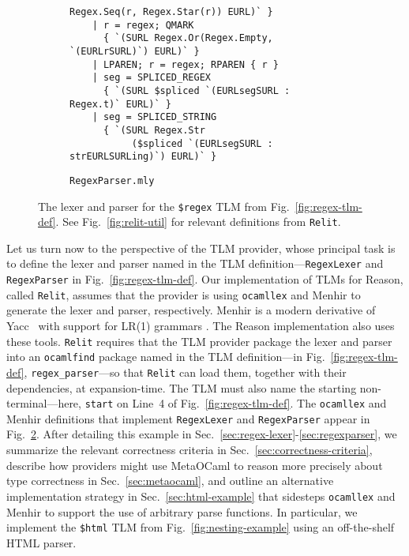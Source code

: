 \documentclass[acmsmall,screen]{acmart}
\newcommand{\li}[1]{\lstinline[basicstyle=\ttfamily\fontsize{9pt}{1em}\selectfont]{#1}}
\begin{document}
\begin{figure}
\begin{subfigure}[t]{0.61\textwidth}
\begin{lstlisting}[morekeywords={token,left,start},stringstyle=\ttfamily\color{black}]
           Regex.Seq(r, Regex.Star(r)) EURL)` }
    | r = regex; QMARK 
      { `(SURL Regex.Or(Regex.Empty, `(EURLrSURL)`) EURL)` }
    | LPAREN; r = regex; RPAREN { r }
    | seg = SPLICED_REGEX 
      { `(SURL $spliced `(EURLsegSURL : Regex.t)` EURL)` }
    | seg = SPLICED_STRING 
      { `(SURL Regex.Str
           ($spliced `(EURLsegSURL : strEURLSURLing)`) EURL)` }
\end{lstlisting}
\vspace{-5px}
\caption{\li{RegexParser.mly}}
\label{fig:regex-parser}
\end{subfigure}
\vspace{1px}
\caption{The lexer and parser for the \li{$regex} TLM from Fig.~\ref{fig:regex-tlm-def}. See Fig.~\ref{fig:relit-util} for relevant definitions from \li{Relit}.}
\label{fig:lexer-and-parser}
\vspace{-7px}
\end{figure}

Let us turn now to the perspective of the TLM provider, whose principal task is to define the lexer and parser named in the TLM definition---\li{RegexLexer} and \li{RegexParser} in Fig.~\ref{fig:regex-tlm-def}. Our implementation of TLMs for Reason, called \li{Relit}, assumes that the provider is using \li{ocamllex} \cite{ocaml-manual} and Menhir  \cite{pottier2016menhir,DBLP:journals/entcs/PottierR06} to generate the lexer and parser, respectively. Menhir is a modern derivative of Yacc~\cite{johnson1975yacc} with support for LR(1) grammars \cite{jourdan2012validating,DBLP:journals/entcs/PottierR06}. The Reason implementation also uses these tools. \li{Relit} requires that the TLM provider package the lexer and parser into an \li{ocamlfind} package named in the TLM definition---in Fig.~\ref{fig:regex-tlm-def}, \li{regex_parser}---so that \li{Relit} can load them, together with their dependencies, at expansion-time. The TLM must also name the starting non-terminal---here, \li{start} on Line~4 of Fig.~\ref{fig:regex-tlm-def}. 
The \li{ocamllex} and Menhir definitions that implement \li{RegexLexer} and \li{RegexParser} appear in Fig.~\ref{fig:lexer-and-parser}. 
After detailing this example in Sec.~\ref{sec:regex-lexer}-\ref{sec:regexparser}, we summarize the relevant correctness criteria in Sec.~\ref{sec:correctness-criteria}, describe how providers might use MetaOCaml to reason more precisely about type correctness in Sec.~\ref{sec:metaocaml}, and outline an alternative implementation strategy in Sec.~\ref{sec:html-example} that sidesteps \li{ocamllex} and Menhir to support the use of arbitrary parse functions. In particular, we implement the \li{$html} TLM from Fig.~\ref{fig:nesting-example} using an off-the-shelf HTML parser.
\end{document}
